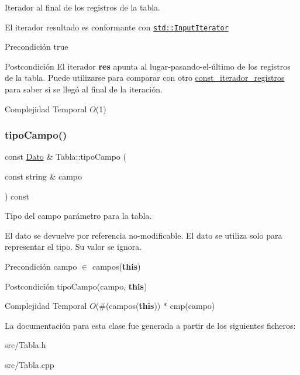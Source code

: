 Iterador al final de los registros de la tabla. 

El iterador resultado es conformante con \href{http://en.cppreference.com/w/cpp/concept/InputIterator}{\tt std\+::\+Input\+Iterator}

\begin{DoxyPrecond}{Precondición}
true 
\end{DoxyPrecond}
\begin{DoxyPostcond}{Postcondición}
El iterador {\bfseries res} apunta al lugar-\/pasando-\/el-\/último de los registros de la tabla. Puede utilizarse para comparar con otro \mbox{\hyperlink{classTabla_1_1const__iterador__registros}{const\+\_\+iterador\+\_\+registros}} para saber si se llegó al final de la iteración.
\end{DoxyPostcond}

\begin{DoxyDescription}
\item[Complejidad Temporal]$O$(1)
\end{DoxyDescription}\mbox{\label{classTabla_ad73268a20c41a93f2ffd34656e1f0123}} 
\subsubsection{\texorpdfstring{tipo\+Campo()}{tipoCampo()}}
{\footnotesize\ttfamily const \mbox{\hyperlink{classDato}{Dato}} \& Tabla\+::tipo\+Campo (\begin{DoxyParamCaption}\item[{const string \&}]{campo }\end{DoxyParamCaption}) const}



Tipo del campo parámetro para la tabla. 

El dato se devuelve por referencia no-\/modificable. El dato se utiliza solo para representar el tipo. Su valor se ignora.

\begin{DoxyPrecond}{Precondición}
campo $\in$ campos({\bfseries this}) 
\end{DoxyPrecond}
\begin{DoxyPostcond}{Postcondición}
tipo\+Campo(campo, {\bfseries this})
\end{DoxyPostcond}

\begin{DoxyDescription}
\item[Complejidad Temporal]$O$(\#(campos({\bfseries this})) $\ast$ cmp(campo)
\end{DoxyDescription}

La documentación para esta clase fue generada a partir de los siguientes ficheros\+:\begin{DoxyCompactItemize}
\item 
src/Tabla.\+h\item 
src/Tabla.\+cpp\end{DoxyCompactItemize}
